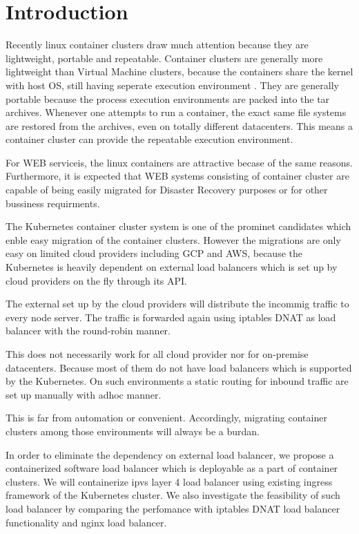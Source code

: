 \section{Introduction}

Recently linux container clusters draw much attention because they are lightweight, portable and repeatable.
Container clusters are generally more lightweight than Virtual Machine clusters, 
because the containers share the kernel with host OS, still having seperate execution environment . 
They are generally portable because the process execution environments are packed
into the tar archives.
Whenever one attempts to run a container, the exact same file systems are restored from the archives, 
even on totally different datacenters. 
This means a container cluster can provide the repeatable execution environment.

For WEB serviceis, the linux containers are attractive becase of the same reasons. 
Furthermore, it is expected that WEB systems consisting of container cluster are 
capable of being easily migrated for Disaster Recovery purposes or for other bussiness requirments.


The Kubernetes\cite{K8s2017} container cluster system is one of the prominet candidates
which enble easy migration of the container clusters.
However the migrations are only easy on limited cloud providers including GCP and AWS, because
the Kubernetes is heavily dependent on external load balancers which is set up by cloud providers on the fly through its API.  

The external set up by the cloud providers will distribute the incommig traffic to every node server.
The traffic is forwarded again using iptables DNAT\cite{MartinA.Brown2017,Marmol2015} as load balancer with the round-robin manner. 

This does not necessarily work for all cloud provider nor for on-premise datacenters.
Because most of them do not have load balancers which is supported by the Kubernetes.
On such environments a static routing for inbound traffic are set up manually with adhoc manner.

This is far from automation or convenient.
Accordingly, migrating container clusters among those environments will always be a burdan.

In order to eliminate the dependency on external load balancer, 
we propose a containerized software load balancer which is deployable as a part of container clusters.
We will containerize ipvs\cite{Zhang2000} layer 4 load balancer using existing ingress framework of the Kubernetes cluster. 
We also investigate the feasibility of such load balancer by comparing the perfomance 
with iptables DNAT load balancer functionality and nginx load balancer.

